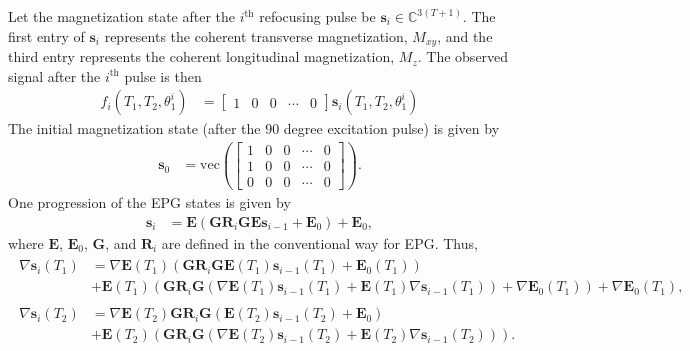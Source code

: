 \documentclass[12pt]{article}
\theoremstyle{plain}
\theoremstyle{definition}
\newcommand{\CC}{\mathbb{C}} %
\newcommand{\nth}[1]{#1^{\mathrm{th}}}
\renewcommand{\vec}[1]{\mathbf{#1}}
\begin{document}
Let the magnetization state after the $\nth{i}$ refocusing pulse be $\vec s_i \in \CC^{3(T+1)}$. The first entry of $\vec s_i$ represents the
coherent transverse magnetization, $M_{xy}$, and the third entry represents the coherent longitudinal magnetization, $M_z$. The observed
signal after the $\nth{i}$ pulse is then
\begin{align}
  f_i(T_1, T_2, \theta_1^i) &= \begin{bmatrix}1 & 0 & 0 & \cdots & 0 \end{bmatrix} \vec s_i(T_1, T_2, \theta_1^i)
  \label{eqn:epgrec}
\end{align}
The initial magnetization state (after the 90 degree excitation pulse) is given by 
\begin{align}
  \vec s_0 &= \mathrm{vec}\left(\begin{bmatrix}
    1 & 0 & 0 & \cdots & 0 \\
    1 & 0 & 0 & \cdots & 0 \\
    0 & 0 & 0 & \cdots & 0 
\end{bmatrix}\right).
  \label{eqn:s0}
\end{align}
One progression of the EPG states is given by
\begin{align}
  \vec s_i & = \vec E \left(\vec G \vec R_i\vec{GE}\vec s_{i-1} + \vec E_0 \right) + \vec E_0,
  \label{eqn:skrec}
\end{align}
where $\vec E$, $\vec E_0$, $\vec G$, and $\vec R_i$ are defined in the conventional way for EPG.
Thus,
\begin{align}
  \begin{split}
    \nabla\vec s_i(T_1) &= \nabla\vec E(T_1)\left(\vec{GR}_i \vec{GE}(T_1)\vec s_{i-1}(T_1) + \vec E_0(T_1)\right)  \\
    &+ \vec E(T_1)\left(\vec{GR}_i \vec{G}\left(\nabla\vec E(T_1)\vec s_{i-1}(T_1) + \vec E(T_1)\nabla\vec s_{i-1}(T_1)\right) + \nabla\vec E_0(T_1)\right)
    + \nabla\vec E_0(T_1),
  \end{split}
  \label{eqn:dsdT1} \\
  \begin{split}
  \nabla\vec s_i(T_2) &= \nabla\vec E(T_2)\vec{GR}_i \vec{G}\left(\vec E(T_2)\vec s_{i-1}(T_2) + \vec E_0\right) \\
  &+ \vec E(T_2)\left(\vec{GR}_i \vec{G}\left(\nabla\vec E(T_2)\vec s_{i-1}(T_2) + \vec E(T_2)\nabla\vec s_{i-1}(T_2)\right)\right).
  \end{split}
  \label{eqn:dsdT2}
\end{align}
\end{document}
